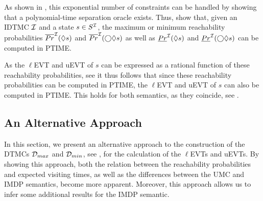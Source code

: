 As shown in \cite{complexity_model_checking_interval-valued_DTMCs}, this exponential number of constraints can be handled by showing that a polynomial-time separation oracle exists. Thus, \cite{complexity_model_checking_interval-valued_DTMCs} show that, given an IDTMC $\mathcal{I}$ and a state $s\in S^{\mathcal{I}}$, the maximum or minimum reachability probabilities $\overline{Pr}^{\mathcal{I}}(\lozenge s)$ and $\overline{Pr}^{\mathcal{I}}(\bigcirc \lozenge s)$ as well as $\underline{Pr}^{\mathcal{I}}(\lozenge s)$ and $\underline{Pr}^{\mathcal{I}}(\bigcirc \lozenge s)$ can be computed in PTIME.

As the $\ell$EVT and uEVT of $s$ can be expressed as a rational function of these reachability probabilities, see  it thus follows that since these reachability probabilities can be computed in PTIME, the $\ell$EVT and uEVT of $s$ can also be computed in PTIME. This holds for both semantics, as they coincide, see .


\subsection{An Alternative Approach}\label{sec:IMDP_semantic}
In this section, we present an alternative approach to the construction of the DTMCs $\mathcal{D}_{max}$ and $\mathcal{D}_{min}$, see , for the calculation of the $\ell$EVTs and uEVTs. By showing this approach, both the relation between the reachability probabilities and expected visiting times, as well as the differences between the UMC and IMDP semantics, become more apparent. Moreover, this approach allows us to infer some additional results for the IMDP semantic.

